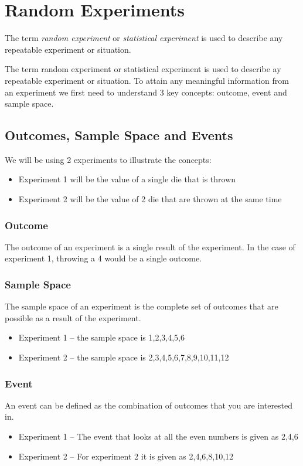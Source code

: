 \documentclass[10pt,a4paper,titlepage,twoside,openright]{report}
\begin{document}
\section{Random Experiments}
The term \textit{random experiment} or \textit{statistical experiment} is used to describe any repeatable experiment or situation.


The term random experiment or statistical experiment is used to describe ay repeatable  experiment or situation. To attain any meaningful information from an experiment we first need to understand 3 key concepts: outcome, event and sample space.



\subsection{Outcomes, Sample Space and Events}

We will be using 2 experiments to illustrate the concepts:
\begin{itemize}
 \item Experiment 1 will be the value of a single die that is thrown
 \item Experiment 2 will be the value of 2 die that are thrown at the same time 
\end{itemize}

\subsubsection*{Outcome}
The outcome of an experiment is a single result of the experiment. In the case of experiment 1, throwing a 4 would be a single outcome.

\subsubsection*{Sample Space}
The sample space of an experiment is the complete set of outcomes that are possible as a result of the experiment.
\begin{itemize}
\item Experiment 1 – the sample space is {1,2,3,4,5,6}
\item Experiment 2 – the sample space is {2,3,4,5,6,7,8,9,10,11,12}
\end{itemize}

\subsubsection{Event}
An event can be defined as the combination of outcomes that you are interested in.
\begin{itemize}
\item Experiment 1 – The event that looks at all the even numbers is given as {2,4,6}
\item Experiment 2 – For experiment 2 it is given as {2,4,6,8,10,12}
\end{itemize}
\end{document}
